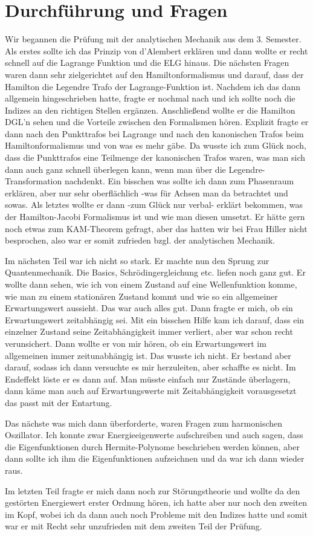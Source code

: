 \section{Durchführung und Fragen}

\noindent Wir begannen die Prüfung mit der analytischen Mechanik aus dem 3. Semester. 
Als erstes sollte ich das Prinzip von d'Alembert erklären und dann wollte er recht schnell auf die Lagrange Funktion und die ELG hinaus. 
Die nächsten Fragen waren dann sehr zielgerichtet auf den Hamiltonformalismus und darauf, dass der Hamilton die Legendre Trafo der Lagrange-Funktion ist.
Nachdem ich das dann allgemein hingeschrieben hatte, fragte er nochmal nach und ich sollte noch die Indizes an den richtigen Stellen ergänzen. 
Anschließend wollte er die Hamilton DGL'n sehen und die Vorteile zwischen den Formalismen hören. Explizit fragte er dann nach den Punkttrafos bei Lagrange und nach den kanonischen Trafos beim Hamiltonformalismus und von was es mehr gäbe. Da wusste ich zum Glück noch, dass die Punkttrafos eine Teilmenge der kanonischen Trafos waren, was man sich dann auch ganz schnell überlegen kann, wenn man über die Legendre-Transformation nachdenkt. 
Ein bisschen was sollte ich dann zum Phasenraum erklären, aber nur sehr oberflächlich -was für Achsen man da betrachtet und sowas. 
Als letztes wollte er dann -zum Glück nur verbal- erklärt bekommen, was der Hamilton-Jacobi Formalismus ist und wie man diesen umsetzt. 
Er hätte gern noch etwas zum KAM-Theorem gefragt, aber das hatten wir bei Frau Hiller nicht besprochen, also war er somit zufrieden bzgl. der analytischen Mechanik.

\noindent Im nächsten Teil war ich nicht so stark. Er machte nun den Sprung zur Quantenmechanik. Die Basics, Schrödingergleichung etc. liefen noch ganz gut. Er wollte dann sehen, wie ich von einem Zustand auf eine Wellenfunktion komme, wie man zu einem stationären Zustand kommt und wie so ein allgemeiner Erwartungswert aussieht. Das war auch alles gut. 
Dann fragte er mich, ob ein Erwartungswert zeitabhängig sei. Mit ein bisschen Hilfe kam ich darauf, dass ein einzelner Zustand seine Zeitabhängigkeit immer verliert, aber war schon recht verunsichert. Dann wollte er von mir hören, ob ein Erwartungswert im allgemeinen immer zeitunabhängig ist. Das wusste ich nicht. Er bestand aber darauf, sodass ich dann versuchte es mir herzuleiten, aber schaffte es nicht. Im Endeffekt löste er es dann auf. Man müsste einfach nur Zustände überlagern, dann käme man auch auf Erwartungswerte mit Zeitabhängigkeit vorausgesetzt das passt mit der Entartung.

\noindent Das nächste was mich dann überforderte, waren Fragen zum harmonischen Oszillator. Ich konnte zwar Energieeigenwerte aufschreiben und auch sagen, dass die Eigenfunktionen durch Hermite-Polynome beschrieben werden können, aber dann sollte ich ihm die Eigenfunktionen aufzeichnen und da war ich dann wieder raus. 

\noindent Im letzten Teil fragte er mich dann noch zur Störungstheorie und wollte da den gestörten Energiewert erster Ordnung hören, ich hatte aber nur noch den zweiten im Kopf, wobei ich da dann auch noch Probleme mit den Indizes hatte und somit war er mit Recht sehr unzufrieden mit dem zweiten Teil der Prüfung.

